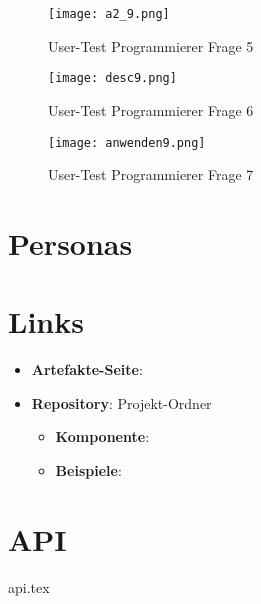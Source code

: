 \begin{figure}[!p]
    \centering
    \begin{minipage}[b]{0.6\textwidth}
        \centering
        \texttt{[image: a2\_9.png]}
        \caption{\centering User-Test Programmierer Frage 5}
        \label{img:userTestA2}
    \end{minipage}
    \begin{minipage}[b]{0.6\textwidth}
        \centering
        \texttt{[image: desc9.png]}
        \caption{\centering User-Test Programmierer Frage 6}
        \label{img:userTestDesc}
    \end{minipage}
    \begin{minipage}[b]{0.6\textwidth}
        \centering
        \texttt{[image: anwenden9.png]}
        \caption{\centering User-Test Programmierer Frage 7}
        \label{img:userTestUsage}
    \end{minipage}
\end{figure}
\graphicspath{ {./img/} }



\chapter{Personas}
\label{chap:perosnas}






\chapter{Links}
\label{chap:links}

\begin{itemize}
    \item \textbf{Artefakte-Seite}: 
    \item \textbf{Repository}: Projekt-Ordner 
        \begin{itemize}
            \item \textbf{Komponente}: 
            \item \textbf{Beispiele}: 
        \end{itemize}
\end{itemize}



\chapter{API}
\label{chap:api}

{api.tex}
